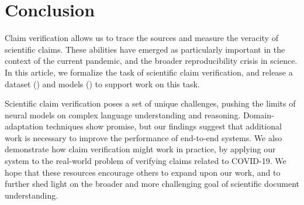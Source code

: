 \section{Conclusion}

Claim verification allows us to trace the sources and measure the veracity of scientific claims. These abilities have emerged as particularly important in the context of the current pandemic, and the broader reproducibility crisis in science. In this article, we formalize the task of scientific claim verification, and release a dataset (\ours) and models (\sysname) to support work on this task.

Scientific claim verification poses a set of unique challenges, pushing the limits of neural models on complex language understanding and reasoning. Domain-adaptation techniques show promise, but our findings suggest that additional work is necessary to improve the performance of end-to-end systems. We also demonstrate how claim verification might work in practice, by applying our system to the real-world problem of verifying claims related to COVID-19. We hope that these resources encourage others to expand upon our work, and to further shed light on the broader and more challenging goal of scientific document understanding.
